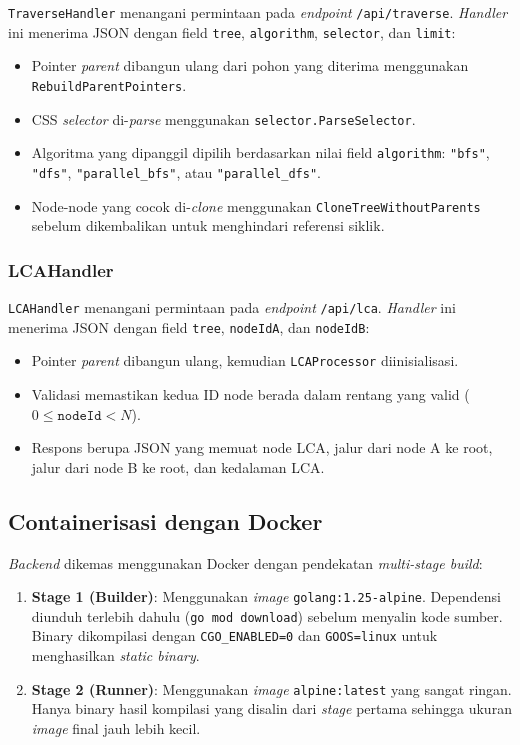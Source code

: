 \texttt{TraverseHandler} menangani permintaan pada \textit{endpoint} \texttt{/api/traverse}. \textit{Handler} ini menerima JSON dengan field \texttt{tree}, \texttt{algorithm}, \texttt{selector}, dan \texttt{limit}:

\begin{itemize}
    \item Pointer \textit{parent} dibangun ulang dari pohon yang diterima menggunakan \texttt{RebuildParentPointers}.
    \item CSS \textit{selector} di-\textit{parse} menggunakan \texttt{selector.ParseSelector}.
    \item Algoritma yang dipanggil dipilih berdasarkan nilai field \texttt{algorithm}: \texttt{"bfs"}, \texttt{"dfs"}, \texttt{"parallel\_bfs"}, atau \texttt{"parallel\_dfs"}.
    \item Node-node yang cocok di-\textit{clone} menggunakan \texttt{CloneTreeWithoutParents} sebelum dikembalikan untuk menghindari referensi siklik.
\end{itemize}

\subsubsection{LCAHandler}

\texttt{LCAHandler} menangani permintaan pada \textit{endpoint} \texttt{/api/lca}. \textit{Handler} ini menerima JSON dengan field \texttt{tree}, \texttt{nodeIdA}, dan \texttt{nodeIdB}:

\begin{itemize}
    \item Pointer \textit{parent} dibangun ulang, kemudian \texttt{LCAProcessor} diinisialisasi.
    \item Validasi memastikan kedua ID node berada dalam rentang yang valid ($0 \leq \texttt{nodeId} < N$).
    \item Respons berupa JSON yang memuat node LCA, jalur dari node A ke root, jalur dari node B ke root, dan kedalaman LCA.
\end{itemize}

\subsection{Containerisasi dengan Docker}

\textit{Backend} dikemas menggunakan Docker dengan pendekatan \textit{multi-stage build}:

\begin{enumerate}
    \item \textbf{Stage 1 (Builder)}: Menggunakan \textit{image} \texttt{golang:1.25-alpine}. Dependensi diunduh terlebih dahulu (\texttt{go mod download}) sebelum menyalin kode sumber. Binary dikompilasi dengan \texttt{CGO\_ENABLED=0} dan \texttt{GOOS=linux} untuk menghasilkan \textit{static binary}.
    \item \textbf{Stage 2 (Runner)}: Menggunakan \textit{image} \texttt{alpine:latest} yang sangat ringan. Hanya binary hasil kompilasi yang disalin dari \textit{stage} pertama sehingga ukuran \textit{image} final jauh lebih kecil.
\end{enumerate}

